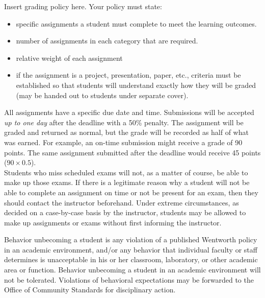 \documentclass{wit_syllabus2}
\begin{document}
Insert grading policy here.  Your policy must state:
\begin{itemize}
\item specific assignments a student must complete to meet the learning outcomes.
\item number of assignments in each category that are required.
\item relative weight of each assignment
\item if the assignment is a project, presentation, paper, etc., criteria must be established so that students will understand exactly how they will be graded (may be handed out to students under separate cover).
\end{itemize}

\SyllabusGradingSystem

\SyllabusDropAdd


All assignments have a specific due date and time.
Submissions will be accepted \textit{up to one day} after the deadline with a 50\% penalty.
The assignment will be graded and returned as normal, but the grade will be recorded as half of what was earned.
For example, an on-time submission might receive a grade of 90 points.
The same assignment submitted after the deadline would receive 45 points ($90 \times 0.5$).
\\

Students who miss scheduled exams will not, as a matter of course, be able to make up those exams.
If there is a legitimate reason why a student will not be able to complete an assignment on time or not be present for an exam, then they should contact the instructor beforehand.
Under extreme circumstances, as decided on a case-by-case basis by the instructor, students may be allowed to make up assignments or exams without first informing the instructor.

\SyllabusAcademicSupport

\SyllabusAcademicHonesty


Behavior unbecoming a student is any violation of a published Wentworth policy in an academic environment, and/or any behavior that individual faculty or staff determines is unacceptable in his or her classroom, laboratory, or other academic area or function.
Behavior unbecoming a student in an academic environment will not be tolerated.
Violations of behavioral expectations may be forwarded to the Office of Community Standards for disciplinary action.
\\
\end{document}
